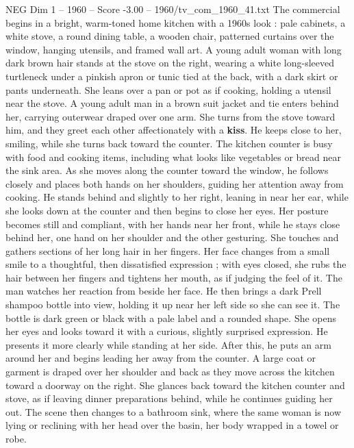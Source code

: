 \begin{textsample}{NEG Dim 1 – 1960 – Score -3.00 – 1960/tv\_com\_1960\_41.txt}  \label{ex:f1_neg_028}
The commercial begins in a bright, warm-toned home kitchen with a 1960s look : pale cabinets, a white stove, a round dining table, a wooden chair, patterned curtains over the window, hanging utensils, and framed wall art.
A young adult woman with long dark brown hair stands at the stove on the right, wearing a white long-sleeved turtleneck under a pinkish apron or tunic tied at the back, with a dark skirt or pants underneath.
She leans over a pan or pot as if cooking, holding a utensil near the stove.
A young adult man in a brown suit jacket and tie enters behind her, carrying outerwear draped over one arm.
She turns from the stove toward him, and they greet each other affectionately with a \textbf{kiss}.
He keeps close to her, smiling, while she turns back toward the counter.
The kitchen counter is busy with food and cooking items, including what looks like vegetables or bread near the sink area.
As she moves along the counter toward the window, he follows closely and places both hands on her shoulders, guiding her attention away from cooking.
He stands behind and slightly to her right, leaning in near her ear, while she looks down at the counter and then begins to close her eyes.
Her posture becomes still and compliant, with her hands near her front, while he stays close behind her, one hand on her shoulder and the other gesturing.
She touches and gathers sections of her long hair in her fingers.
Her face changes from a small smile to a thoughtful, then dissatisfied expression ; with eyes closed, she rubs the hair between her fingers and tightens her mouth, as if judging the feel of it.
The man watches her reaction from beside her face.
He then brings a dark Prell shampoo bottle into view, holding it up near her left side so she can see it.
The bottle is dark green or black with a pale label and a rounded shape.
She opens her eyes and looks toward it with a curious, slightly surprised expression.
He presents it more clearly while standing at her side.
After this, he puts an arm around her and begins leading her away from the counter.
A large coat or garment is draped over her shoulder and back as they move across the kitchen toward a doorway on the right.
She glances back toward the kitchen counter and stove, as if leaving dinner preparations behind, while he continues guiding her out.
The scene then changes to a bathroom sink, where the same woman is now lying or reclining with her head over the basin, her body wrapped in a towel or robe.

\end{textsample}

